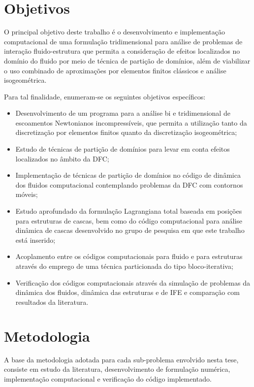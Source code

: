 \section[Objetivos]{Objetivos}

O principal objetivo deste trabalho é o desenvolvimento e implementação computacional de uma formulação tridimensional para análise de problemas de interação fluido-estrutura que permita a consideração de efeitos localizados no domínio do fluido por meio de técnica de partição de domínios, além de viabilizar o uso combinado de aproximações por elementos finitos clássicos e análise isogeométrica.

Para tal finalidade, enumeram-se os seguintes objetivos específicos:

\begin{itemize}
	\item Desenvolvimento de um programa para a análise bi e tridimensional de escoamentos Newtonianos incompressíveis, que permita a utilização tanto da discretização por elementos finitos quanto da discretização isogeométrica;
	
	\item Estudo de técnicas de partição de domínios para levar em conta efeitos localizados no âmbito da DFC;
	
	\item Implementação de técnicas de partição de domínios no código de dinâmica dos fluidos computacional contemplando problemas da DFC com contornos móveis;
	
	\item Estudo aprofundado da formulação Lagrangiana total baseada em posições para estruturas de cascas, bem como do código computacional para análise dinâmica de cascas desenvolvido no grupo de pesquisa em que este trabalho está inserido;
	
	\item Acoplamento entre os códigos computacionais para fluido e para estruturas através do emprego de uma técnica particionada do tipo bloco-iterativa;
	
	\item  Verificação dos códigos computacionais através da simulação de problemas da dinâmica dos fluidos, dinâmica das estruturas e de IFE e comparação com resultados da literatura.
	
\end{itemize}

\section[Metodologia]{Metodologia} 
A base da metodologia adotada para cada sub-problema envolvido nesta tese, consiste em estudo da literatura, desenvolvimento de formulação numérica, implementação computacional e verificação do código implementado.

